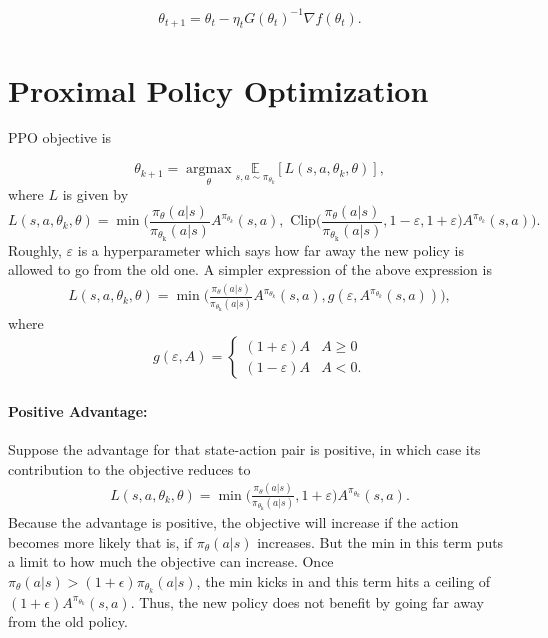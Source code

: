 \begin{align*}
	\theta_{t+1} = \theta_t - \eta_t G(\theta_t)^{-1}\nabla f(\theta_t).
\end{align*}


\section{Proximal Policy Optimization}

PPO objective is 

$$ \theta_{k+1} = \underset{\theta}{\operatorname{argmax}} \underset{s,a\sim \pi_{\theta_k}}{\mathbb{E}} [L(s, a, \theta_k, \theta)],$$
where $L$ is given by
$$L(s, a, \theta_k, \theta) = \min \Bigg(\frac{\pi_{\theta}\left(a | s\right)}{\pi_{\theta_{\text {k}}}\left(a | s\right)} A^{\pi_{\theta_k}}(s,a), \textrm{ Clip}\Bigg(\frac{\pi_{\theta}\left(a | s\right)}{\pi_{\theta_{\text {k}}}\left(a | s\right)}, 1-\varepsilon, 1+\varepsilon\Bigg) A^{\pi_{\theta_k}}(s,a)\Bigg).$$
Roughly, $\varepsilon$ is a hyperparameter which says how far away the new policy is allowed to go from the old one. A simpler expression of the above expression is
\begin{align}
	L(s, a, \theta_k, \theta) = \min \Bigg(\frac{\pi_{\theta}\left(a | s\right)}{\pi_{\theta_{\text {k}}}\left(a | s\right)} A^{\pi_{\theta_k}}(s,a), g(\varepsilon, A^{\pi_{\theta_k}}(s,a)) \Bigg),
	\label{eq:ppo_objective}
\end{align}
where 
\begin{align}
	g(\varepsilon,A) = 
	\begin{cases}
		(1+\varepsilon)A & A\geq 0\\
		(1-\varepsilon)A & A< 0.
	\end{cases}
	\label{eq:ppo_clip}
\end{align}

\paragraph{Positive Advantage:} Suppose the advantage for that state-action pair is positive, in which case its contribution to the objective reduces to
\begin{align}
	L(s, a, \theta_k, \theta) = \min \Bigg(\frac{\pi_{\theta}\left(a | s\right)}{\pi_{\theta_{\text {k}}}\left(a | s\right)}, 1+\varepsilon \Bigg) A^{\pi_{\theta_k}}(s,a).
	\label{eq:ppo_positive}
\end{align}
Because the advantage is positive, the objective will increase if the action becomes more likely that is, if $\pi_{\theta}(a|s)$ increases. But the min in this term puts a limit to how much the objective can increase. Once $\pi_{\theta}(a|s) > (1+\epsilon) \pi_{\theta_k}(a|s)$, the min kicks in and this term hits a ceiling of $(1+\epsilon) A^{\pi_{\theta_k}}(s,a)$. Thus, the new policy does not benefit by going far away from the old policy.

